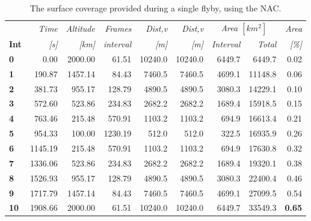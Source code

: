 \begin{table}[htb]
  \centering
    \begin{tabular}{l|r|r|r|r|r|r|r|r|}
      & \textit{Time} & \textit{Altitude} & \textit{Frames} & \textit{Dist,v} & \textit{Dist,v} & \multicolumn{2}{c|}{\textit{Area $[km^2]$}} & \multicolumn{1}{r}{\textit{Area}} \\
\textbf{Int} & \textit{[s]} & \textit{[km]} & \textit{interval} & \textit{[m]} & \textit{[m]} & \textit{Interval} & \textit{Total} & \multicolumn{1}{r}{\textit{[\%]}} \bigstrut[b]\\
\hline
\textbf{0} & 0.00  & 2000.00 & 61.51 & 10240.0 & 10240.0 & 6449.7 & 6449.7 & 0.02 \bigstrut[t]\\
\textbf{1} & 190.87 & 1457.14 & 84.43 & 7460.5 & 7460.5 & 4699.1 & 11148.8 & 0.06 \\
\textbf{2} & 381.73 & 955.17 & 128.79 & 4890.5 & 4890.5 & 3080.3 & 14229.1 & 0.10 \\
\textbf{3} & 572.60 & 523.86 & 234.83 & 2682.2 & 2682.2 & 1689.4 & 15918.5 & 0.15 \\
\textbf{4} & 763.46 & 215.48 & 570.91 & 1103.2 & 1103.2 & 694.9 & 16613.4 & 0.21 \\
\textbf{5} & 954.33 & 100.00 & 1230.19 & 512.0 & 512.0 & 322.5 & 16935.9 & 0.26 \\
\textbf{6} & 1145.19 & 215.48 & 570.91 & 1103.2 & 1103.2 & 694.9 & 17630.8 & 0.32 \\
\textbf{7} & 1336.06 & 523.86 & 234.83 & 2682.2 & 2682.2 & 1689.4 & 19320.1 & 0.38 \\
\textbf{8} & 1526.93 & 955.17 & 128.79 & 4890.5 & 4890.5 & 3080.3 & 22400.4 & 0.46 \\
\textbf{9} & 1717.79 & 1457.14 & 84.43 & 7460.5 & 7460.5 & 4699.1 & 27099.5 & 0.54 \\
\textbf{10} & 1908.66 & 2000.00 & 61.51 & 10240.0 & 10240.0 & 6449.7 & 33549.3 & \textbf{0.65} \\
\end{tabular}%
  \caption{The surface coverage provided during a single flyby, using the NAC.}
  \label{tab:nac_flyby_coverage}%
\end{table}%
